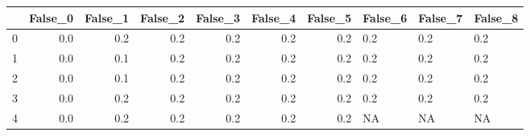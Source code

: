 \begin{tabular}{lrrrrrrlll}
\toprule
{} &  False\_0 &  False\_1 &  False\_2 &  False\_3 &  False\_4 &  False\_5 & False\_6 & False\_7 & False\_8 \\ \hline
\midrule
0 &      0.0 &      0.2 &      0.2 &      0.2 &      0.2 &      0.2 &     0.2 &     0.2 &     0.2 \\ \hline
1 &      0.0 &      0.1 &      0.2 &      0.2 &      0.2 &      0.2 &     0.2 &     0.2 &     0.2 \\ \hline
2 &      0.0 &      0.1 &      0.2 &      0.2 &      0.2 &      0.2 &     0.2 &     0.2 &     0.2 \\ \hline
3 &      0.0 &      0.2 &      0.2 &      0.2 &      0.2 &      0.2 &     0.2 &     0.2 &     0.2 \\ \hline
4 &      0.0 &      0.2 &      0.2 &      0.2 &      0.2 &      0.2 &      NA &      NA &      NA \\ \hline
\bottomrule
\end{tabular}

